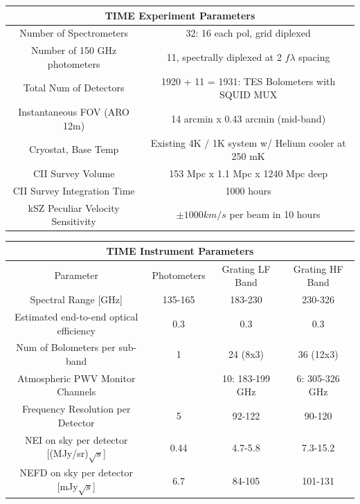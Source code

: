 \documentclass[manuscript]{aastex}
\begin{document}
\begin{center}
    \begin{tabular}{|c|c|}
    \hline
     \multicolumn{2}{|c|}{TIME Experiment Parameters} \\
     \hline
     \hline
      Number of Spectrometers & 32: 16 each pol, grid diplexed \\
      Number of 150 GHz photometers   & 11, spectrally diplexed at 2 $f\lambda$ spacing \\
      Total Num of Detectors & 1920 + 11 = 1931: TES Bolometers with SQUID MUX \\
      Instantaneous FOV (ARO 12m) & 14 arcmin x 0.43 arcmin (mid-band) \\
      Cryostat, Base Temp & Existing 4K / 1K system w/ Helium cooler at 250 mK \\
      CII Survey Volume & 153 Mpc x 1.1 Mpc x 1240 Mpc deep \\
      CII Survey Integration Time & 1000 hours \\
      kSZ Peculiar Velocity Sensitivity & $\pm 1000 km/s$ per beam in 10 hours \\
      \hline
    \end{tabular}
\end{center}

\begin{center}
    \begin{tabular}{|c|c|c|c|}
    \hline
    \multicolumn{4}{|c|}{TIME Instrument Parameters} \\
    \hline
    \hline
    Parameter & Photometers & Grating LF Band & Grating HF Band \\
    \hline
    Spectral Range [GHz] & 135-165 & 183-230 & 230-326 \\
    Estimated end-to-end optical efficiency & 0.3 & 0.3 & 0.3 \\
    Num of Bolometers per sub-band & 1 & 24 (8x3) & 36 (12x3) \\
    Atmospheric PWV Monitor Channels & & 10: 183-199 GHz & 6: 305-326 GHz \\
    Frequency Resolution per Detector & 5 & 92-122 & 90-120 \\
    NEI on sky per detector [(MJy/sr)$\sqrt{s}$] & 0.44 & 4.7-5.8 & 7.3-15.2 \\
    NEFD on sky per detector [mJy$\sqrt{s}$] & 6.7 & 84-105 & 101-131 \\
    \hline
    \end{tabular}
\end{center}
\end{document}
